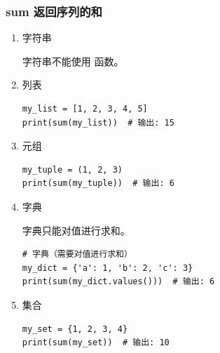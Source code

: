 \subsubsection{sum 返回序列的和}
\begin{enumerate}[label=\arabic*)]
    \item 字符串

    字符串不能使用  函数。

    \item 列表
\begin{lstlisting}[style=demostyle,numbers=none]
my_list = [1, 2, 3, 4, 5]
print(sum(my_list))  # 输出: 15
\end{lstlisting}

    \item 元组
\begin{lstlisting}[style=demostyle,numbers=none]
my_tuple = (1, 2, 3)
print(sum(my_tuple))  # 输出: 6
\end{lstlisting}

    \item 字典

    字典只能对值进行求和。
\begin{lstlisting}[style=demostyle,numbers=none]
# 字典（需要对值进行求和）
my_dict = {'a': 1, 'b': 2, 'c': 3}
print(sum(my_dict.values()))  # 输出: 6
\end{lstlisting}
    \item 集合

\begin{lstlisting}[style=demostyle,numbers=none]
my_set = {1, 2, 3, 4}
print(sum(my_set))  # 输出: 10
\end{lstlisting}
    
\end{enumerate}


